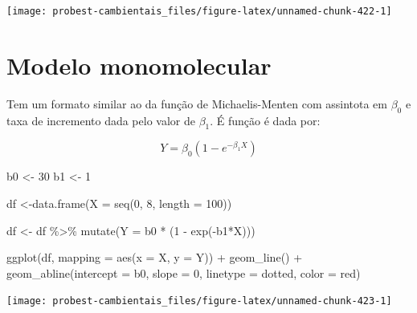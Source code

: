 \documentclass[
]{book}
\newenvironment{Shaded}{\begin{snugshade}}{\end{snugshade}}
\newcommand{\AttributeTok}[1]{\textcolor[rgb]{0.77,0.63,0.00}{#1}}
\newcommand{\DecValTok}[1]{\textcolor[rgb]{0.00,0.00,0.81}{#1}}
\newcommand{\FunctionTok}[1]{\textcolor[rgb]{0.00,0.00,0.00}{#1}}
\newcommand{\NormalTok}[1]{#1}
\newcommand{\OtherTok}[1]{\textcolor[rgb]{0.56,0.35,0.01}{#1}}
\newcommand{\SpecialCharTok}[1]{\textcolor[rgb]{0.00,0.00,0.00}{#1}}
\newcommand{\StringTok}[1]{\textcolor[rgb]{0.31,0.60,0.02}{#1}}
\begin{document}
\begin{center}\texttt{[image: probest-cambientais\_files/figure-latex/unnamed-chunk-422-1]} \end{center}

\hypertarget{modelo-monomolecular}{%
\section{Modelo monomolecular}\label{modelo-monomolecular}}

Tem um formato similar ao da função de Michaelis-Menten com assintota em \(\beta_0\) e taxa de incremento dada pelo valor de \(\beta_1\). É função é dada por:

\[Y = \beta_0 (1 - e^{-\beta_1 X})\]

\begin{Shaded}
\begin{Highlighting}[]
\NormalTok{b0 }\OtherTok{\textless{}{-}} \DecValTok{30}
\NormalTok{b1 }\OtherTok{\textless{}{-}} \DecValTok{1}

\NormalTok{df }\OtherTok{\textless{}{-}}\FunctionTok{data.frame}\NormalTok{(}\AttributeTok{X =} \FunctionTok{seq}\NormalTok{(}\DecValTok{0}\NormalTok{, }\DecValTok{8}\NormalTok{, }\AttributeTok{length =} \DecValTok{100}\NormalTok{))}

\NormalTok{df }\OtherTok{\textless{}{-}}\NormalTok{ df }\SpecialCharTok{\%\textgreater{}\%} \FunctionTok{mutate}\NormalTok{(}\AttributeTok{Y =}\NormalTok{ b0 }\SpecialCharTok{*}\NormalTok{ (}\DecValTok{1} \SpecialCharTok{{-}} \FunctionTok{exp}\NormalTok{(}\SpecialCharTok{{-}}\NormalTok{b1}\SpecialCharTok{*}\NormalTok{X)))}

\FunctionTok{ggplot}\NormalTok{(df, }\AttributeTok{mapping =} \FunctionTok{aes}\NormalTok{(}\AttributeTok{x =}\NormalTok{ X, }\AttributeTok{y =}\NormalTok{ Y)) }\SpecialCharTok{+}
  \FunctionTok{geom\_line}\NormalTok{() }\SpecialCharTok{+}
  \FunctionTok{geom\_abline}\NormalTok{(}\AttributeTok{intercept =}\NormalTok{ b0, }\AttributeTok{slope =} \DecValTok{0}\NormalTok{, }\AttributeTok{linetype =} \StringTok{\textquotesingle{}dotted\textquotesingle{}}\NormalTok{, }\AttributeTok{color =} \StringTok{\textquotesingle{}red\textquotesingle{}}\NormalTok{)}
\end{Highlighting}
\end{Shaded}

\begin{center}\texttt{[image: probest-cambientais\_files/figure-latex/unnamed-chunk-423-1]} \end{center}
\end{document}
